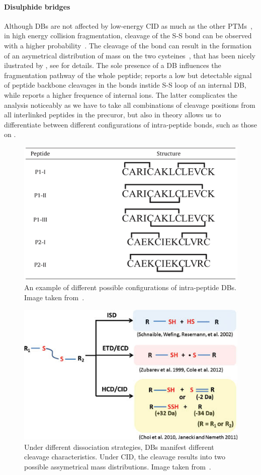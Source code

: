 \paragraph{Disulphide bridges} Although DBs are not affected by low-energy CID as much as the other PTMs~\cite{paizs2005fragmentation, lioe2007novel}, in high energy collision fragmentation, cleavage of the S-S bond can be observed with a higher probability~\cite{bean1992characterization}. The cleavage of the bond can result in the formation of an asymetrical distribution of mass on the two cysteines~\cite{zhang2006mapping}, that has been nicely ilustrated by \citet{tsai2013mass}, see  for details. The sole presence of a DB influences the fragmentation pathway of the whole peptide; \citet{mormann2008fragmentation} reports a low but detectable signal of peptide backbone cleavages in the bonds instide S-S loop of an internal DB, while \citet{clark2011collision} reports a higher frequence of internal ions. The latter complicates the analysis noticeably as we have to take all combinations of cleavage positions from all interlinked peptides in the precuror, but also in theory allows us to differentiate between different configurations of intra-peptide bonds, such as those on .

\begin{figure}
  \centering
  \includegraphics[width=.5\linewidth]{img/intrapeptide-bond.jpeg}
  \caption{An example of different possible configurations of intra-peptide DBs. Image taken from~\citet{durand2013tandem}.}\label{fig:intrapeptide-bonds}
\end{figure}

\begin{figure}
  \centering
  \includegraphics[width=.6\linewidth]{img/disulfide-bond-cleavage-assymetry.jpg}
  \caption{Under different dissociation strategies, DBs manifest different cleavage characteristics. Under CID, the cleavage results into two possible assymetrical mass distributions. Image taken from~\citet{tsai2013mass}.}\label{fig:disulfide-bond-cleavage-assymetry}
\end{figure}

